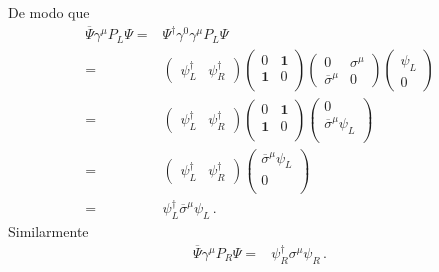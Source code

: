 De modo que
\begin{align}
  \overline{\Psi}\gamma^{\mu}P_{L}\Psi=&\Psi^{\dagger}\gamma^0\gamma^{\mu}P_L \Psi \nonumber\\
=&  \begin{pmatrix}
     \psi_L^{\dagger} & \psi_R^{\dagger}  
  \end{pmatrix}
  \begin{pmatrix}
    0 & \mathbf{1} \\
    \mathbf{1} & 0 \\
  \end{pmatrix}
  \begin{pmatrix}
   0 & \sigma^{\mu}\\
   \overline{\sigma}^{\mu} & 0     
  \end{pmatrix}
  \begin{pmatrix}
   \psi_L\\
     0      
  \end{pmatrix}\nonumber\\
=&  \begin{pmatrix}
     \psi_L^{\dagger} & \psi_R^{\dagger}  
  \end{pmatrix}
  \begin{pmatrix}
    0 & \mathbf{1} \\
    \mathbf{1} & 0 \\
  \end{pmatrix}
  \begin{pmatrix}
     0\\
   \overline{\sigma}^{\mu}\psi_L\\
  \end{pmatrix}\nonumber\\
=&  \begin{pmatrix}
     \psi_L^{\dagger} & \psi_R^{\dagger}  
  \end{pmatrix}
  \begin{pmatrix}
   \overline{\sigma}^{\mu}\psi_L\\
     0\\
  \end{pmatrix}\nonumber\\
=&   \psi_L^{\dagger} \overline{\sigma}^{\mu}\psi_L\,.
\end{align}
Similarmente
\begin{align}
\overline{\Psi}\gamma^{\mu}P_{R}\Psi=&   \psi_R^{\dagger} {\sigma}^{\mu}\psi_R\,.
\end{align}



